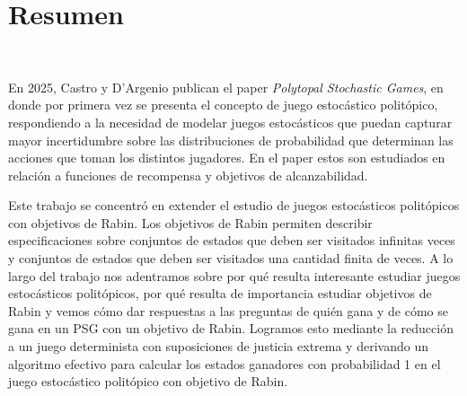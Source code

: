 \chapter*{Resumen}
~\label{abstract}
\vspace{-1cm}

En 2025, Castro y D'Argenio publican el paper \emph{Polytopal Stochastic
	Games}, en donde por primera vez se presenta el concepto de juego estocástico
politópico, respondiendo a la necesidad de modelar juegos estocásticos que
puedan capturar mayor incertidumbre sobre las distribuciones de probabilidad
que determinan las acciones que toman los distintos jugadores. En el paper
estos son estudiados en relación a funciones de recompensa y objetivos de
alcanzabilidad.

Este trabajo se concentró en extender el estudio de juegos estocásticos
politópicos con objetivos de Rabin. Los objetivos de Rabin permiten describir
especificaciones sobre conjuntos de estados que deben ser visitados infinitas
veces y conjuntos de estados que deben ser visitados una cantidad finita de
veces. A lo largo del trabajo nos adentramos sobre por qué resulta interesante
estudiar juegos estocásticos politópicos, por qué resulta de importancia
estudiar objetivos de Rabin y vemos cómo dar respuestas a las preguntas de
quién gana y de cómo se gana en un PSG con un objetivo de Rabin. Logramos esto
mediante la reducción a un juego determinista con suposiciones de justicia
extrema y derivando un algoritmo efectivo para calcular los estados ganadores
con probabilidad 1 en el juego estocástico politópico con objetivo de Rabin.